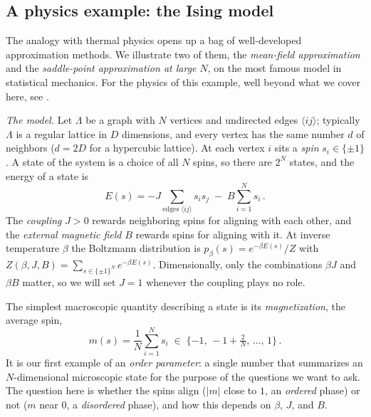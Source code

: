 \documentclass[11pt]{article}
\begin{document}
\subsection{A physics example: the Ising model}
\label{sec:ising-model}

The analogy with thermal physics opens up a bag of well-developed approximation methods. We illustrate two of them, the \emph{mean-field approximation} and the \emph{saddle-point approximation at large $N$}, on the most famous model in statistical mechanics. For the physics of this example, well beyond what we cover here, see \cite[Chapter 1]{TongSFT}.

\emph{The model.} Let $\Lambda$ be a graph with $N$ vertices and undirected edges $\langle ij\rangle$; typically $\Lambda$ is a regular lattice in $D$ dimensions, and every vertex has the same number $d$ of neighbors ($d=2D$ for a hypercubic lattice). At each vertex $i$ sits a \emph{spin} $s_i\in\{\pm 1\}$. A state of the system is a choice of all $N$ spins, so there are $2^N$ states, and the energy of a state is
%
\begin{equation}
    E(s) = -J\!\!\sum_{\text{edges }\langle ij\rangle}\!\! s_i s_j \;-\; B\sum_{i=1}^N s_i\,. \label{ising-E}
\end{equation}
%
The \emph{coupling} $J>0$ rewards neighboring spins for aligning with each other, and the \emph{external magnetic field} $B$ rewards spins for aligning with it. At inverse temperature $\beta$ the Boltzmann distribution is $p_\beta(s) = e^{-\beta E(s)}/Z$ with $Z(\beta,J,B) = \sum_{s\in\{\pm1\}^N} e^{-\beta E(s)}$. Dimensionally, only the combinations $\beta J$ and $\beta B$ matter, so we will set $J = 1$ whenever the coupling plays no role.

The simplest macroscopic quantity describing a state is its \emph{magnetization}, the average spin,
%
\begin{equation}
    m(s) = \frac{1}{N}\sum_{i=1}^N s_i \;\in\; \{-1,\, -1 + \tfrac{2}{N},\, \dots,\, 1\}\,. \label{magnetization}
\end{equation}
%
It is our first example of an \emph{order parameter}: a single number that summarizes an $N$-dimensional microscopic state for the purpose of the questions we want to ask. The question here is whether the spins align ($|m|$ close to $1$, an \emph{ordered} phase) or not ($m$ near $0$, a \emph{disordered} phase), and how this depends on $\beta$, $J$, and $B$.
\end{document}
